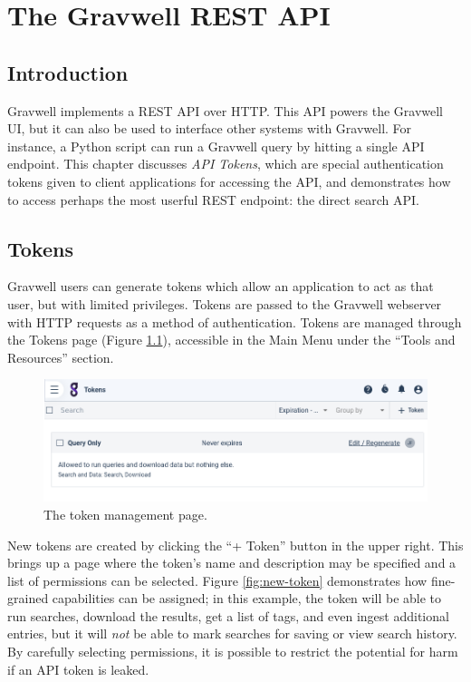 \chapter{The Gravwell REST API}

\section{Introduction}
Gravwell implements a REST API over HTTP. This API powers the Gravwell UI, but it can also be used to interface other systems with Gravwell. For instance, a Python script can run a Gravwell query by hitting a single API endpoint. This chapter discusses \emph{API Tokens}, which are special authentication tokens given to client applications for accessing the API, and demonstrates how to access perhaps the most userful REST endpoint: the direct search API.

\section{Tokens}

Gravwell users can generate tokens which allow an application to act as that user, but with limited privileges. Tokens are passed to the Gravwell webserver with HTTP requests as a method of authentication. Tokens are managed through the Tokens page (Figure \ref{fig:token-page}), accessible in the Main Menu under the ``Tools and Resources'' section.

\begin{figure}
	\includegraphics[width=0.8\linewidth]{images/token-page.png}
	\caption{The token management page.}
	\label{fig:token-page}
\end{figure}

New tokens are created by clicking the ``+ Token'' button in the upper right. This brings up a page where the token's name and description may be specified and a list of permissions can be selected. Figure \ref{fig:new-token} demonstrates how fine-grained capabilities can be assigned; in this example, the token will be able to run searches, download the results, get a list of tags, and even ingest additional entries, but it will \emph{not} be able to mark searches for saving or view search history. By carefully selecting permissions, it is possible to restrict the potential for harm if an API token is leaked.

